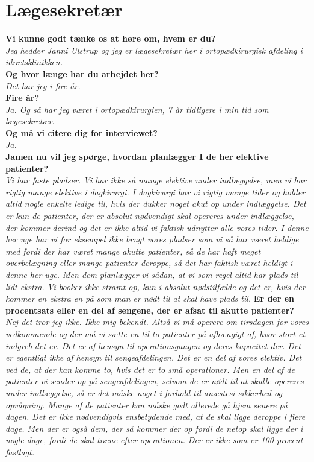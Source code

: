 \section{Lægesekretær} \label{bilagsek}
\textbf{Vi kunne godt tænke os at høre om, hvem er du?}\\
\noindent
\textit{Jeg hedder Janni Ulstrup og jeg er lægesekretær her i ortopædkirurgisk afdeling i idrætsklinikken.} \\
\noindent
\textbf{Og hvor længe har du arbejdet her?} \\
\noindent
\textit{Det har jeg i fire år.} \\
\noindent
\textbf{Fire år?} \\
\noindent
\textit{Ja. Og så har jeg været i ortopædkirurgien, 7 år tidligere i min tid som lægesekretær.} \\
\noindent
\textbf{Og må vi citere dig for interviewet?}\\
\noindent
\textit{Ja.} \\
\noindent
\textbf{Jamen nu vil jeg spørge, hvordan planlægger I de her elektive patienter?}\\
\noindent
\textit{Vi har faste pladser. Vi har ikke så mange elektive under indlæggelse, men vi har rigtig mange elektive i dagkirurgi. I dagkirurgi har vi rigtig mange tider og  holder altid nogle enkelte ledige til, hvis der dukker noget akut op under indlæggelse. Det er kun de patienter, der er absolut nødvendigt skal opereres under indlæggelse, der kommer derind og det er ikke altid vi faktisk udnytter alle vores tider. I denne her uge har vi for eksempel ikke brugt vores pladser som vi så har været heldige med fordi der har været mange akutte patienter, så de har haft meget overbelægning eller mange patienter deroppe, så det har faktisk været heldigt i denne her uge. Men dem planlægger vi sådan, at vi som regel altid har plads til lidt ekstra. Vi booker ikke stramt op, kun i absolut nødstilfælde og det er, hvis der kommer en ekstra en på som man er nødt til at skal have plads til.}
\textbf{Er der en procentsats eller en del af sengene, der er afsat til akutte patienter?}\\
\noindent
\textit{Nej det tror jeg ikke. Ikke mig bekendt. Altså vi må operere om tirsdagen for vores vedkommende og der må vi sætte en til to patienter på afhængigt af, hvor stort et indgreb det er. Det er af hensyn til operationsgangen og deres kapacitet der. Det er egentligt ikke af hensyn til sengeafdelingen. Det er en del af vores elektiv. Det ved de, at der kan komme to, hvis det er to små operationer. Men en del af de patienter vi sender op på sengeafdelingen, selvom de er nødt til at skulle opereres under indlæggelse, så er det måske noget i forhold til anæstesi sikkerhed og opvågning. Mange af de patienter kan måske godt allerede gå hjem senere på dagen. Det er ikke nødvendigvis ensbetydende med, at de skal ligge deroppe i flere dage. Men der er også dem, der så kommer der op fordi de netop skal ligge der i nogle dage, fordi de skal træne efter operationen. Der er ikke som er 100 procent fastlagt.} 
